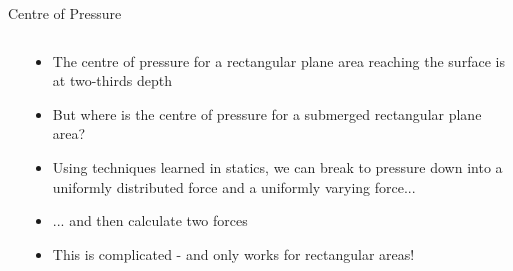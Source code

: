 \documentclass[9pt,xcolor={svgnames, x11names},professionalfonts, mathserif]{beamer}
\begin{document}



    \begin{frame}{Centre of Pressure}
     \begin{columns}
      \begin{column}{0.45\textwidth}
      \end{column}
      \begin{column}{0.5\textwidth}
       \begin{itemize}
        \item The centre of pressure for a rectangular plane area reaching the surface is at two-thirds depth \pause
        \item But where is the centre of pressure for a submerged rectangular plane area?  \pause
        \item Using techniques learned in statics, we can break to pressure down into a uniformly
              distributed force and a uniformly varying force...  \pause
        \item ... and then calculate two forces \pause
        \item This is complicated - and only works for rectangular areas! \end{itemize}
        \end{column}
        \end{columns}

        \end{frame}
\end{document}
